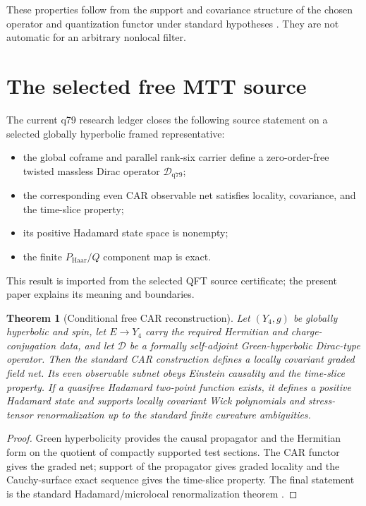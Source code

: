 \documentclass[11pt]{article}
\newtheorem{theorem}{Theorem}[section]
\theoremstyle{definition}
\theoremstyle{remark}
\newcommand{\D}{\mathcal D}
\begin{document}
These properties follow from the support and covariance structure of the
chosen operator and quantization functor under standard hypotheses
\cite{BFV,BarGinouxPfaeffle}. They are not automatic for an arbitrary
nonlocal filter.

\section{The selected free MTT source}

The current q79 research ledger closes the following source statement on a
selected globally hyperbolic framed representative:
\begin{itemize}
\item the global coframe and parallel rank-six carrier define a
zero-order-free twisted massless Dirac operator \(\D_{\mathrm{q79}}\);
\item the corresponding even CAR observable net satisfies locality,
covariance, and the time-slice property;
\item its positive Hadamard state space is nonempty;
\item the finite \(P_{\mathrm{Haar}}/Q\) component map is exact.
\end{itemize}

This result is imported from the selected QFT source certificate; the present
paper explains its meaning and boundaries.

\begin{theorem}[Conditional free CAR reconstruction]
\label{thm:car}
Let \((Y_4,g)\) be globally hyperbolic and spin, let \(E\to Y_4\) carry the
required Hermitian and charge-conjugation data, and let
\(\D\) be a formally self-adjoint Green-hyperbolic Dirac-type operator.
Then the standard CAR construction defines a locally covariant graded field
net. Its even observable subnet obeys Einstein causality and the time-slice
property. If a quasifree Hadamard two-point function exists, it defines a
positive Hadamard state and supports locally covariant Wick polynomials and
stress-tensor renormalization up to the standard finite curvature
ambiguities.
\end{theorem}

\begin{proof}
Green hyperbolicity provides the causal propagator and the Hermitian form on
the quotient of compactly supported test sections. The CAR functor gives the
graded net; support of the propagator gives graded locality and the
Cauchy-surface exact sequence gives the time-slice property. The final
statement is the standard Hadamard/microlocal renormalization theorem
\cite{Dimock,Radzikowski,HollandsWald}.
\end{proof}
\end{document}
